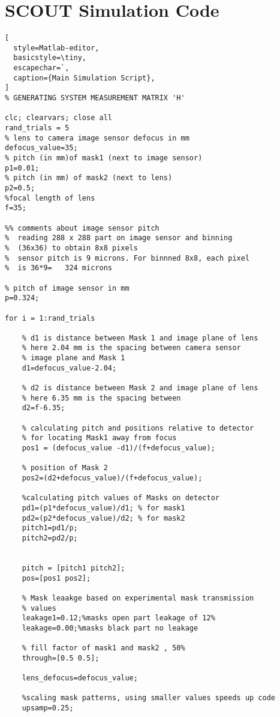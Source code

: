 \chapter{SCOUT Simulation Code}\label{app:scoutSimCode}

\begin{lstlisting}[
  style=Matlab-editor,
  basicstyle=\tiny,
  escapechar=`,
  caption={Main Simulation Script},
]
% GENERATING SYSTEM MEASUREMENT MATRIX 'H'

clc; clearvars; close all
rand_trials = 5
% lens to camera image sensor defocus in mm
defocus_value=35;
% pitch (in mm)of mask1 (next to image sensor)
p1=0.01; 
% pitch (in mm) of mask2 (next to lens)
p2=0.5;
%focal length of lens
f=35; 

%% comments about image sensor pitch
%  reading 288 x 288 part on image sensor and binning 
%  (36x36) to obtain 8x8 pixels
%  sensor pitch is 9 microns. For binnned 8x8, each pixel
%  is 36*9=   324 microns

% pitch of image sensor in mm
p=0.324;

for i = 1:rand_trials
    
    % d1 is distance between Mask 1 and image plane of lens
    % here 2.04 mm is the spacing between camera sensor
    % image plane and Mask 1
    d1=defocus_value-2.04;
    
    % d2 is distance between Mask 2 and image plane of lens
    % here 6.35 mm is the spacing between
    d2=f-6.35;
    
    % calculating pitch and positions relative to detector
    % for locating Mask1 away from focus
    pos1 = (defocus_value -d1)/(f+defocus_value);
    
    % position of Mask 2
    pos2=(d2+defocus_value)/(f+defocus_value); 
    
    %calculating pitch values of Masks on detector
    pd1=(p1*defocus_value)/d1; % for mask1
    pd2=(p2*defocus_value)/d2; % for mask2
    pitch1=pd1/p;
    pitch2=pd2/p;
    
    
    pitch = [pitch1 pitch2];
    pos=[pos1 pos2];
    
    % Mask leaakge based on experimental mask transmission 
    % values
    leakage1=0.12;%masks open part leakage of 12%
    leakage=0.00;%masks black part no leakage
    
    % fill factor of mask1 and mask2 , 50%
    through=[0.5 0.5]; 
    
    lens_defocus=defocus_value;
    
    %scaling mask patterns, using smaller values speeds up code
    upsamp=0.25; 
    

\end{lstlisting}
